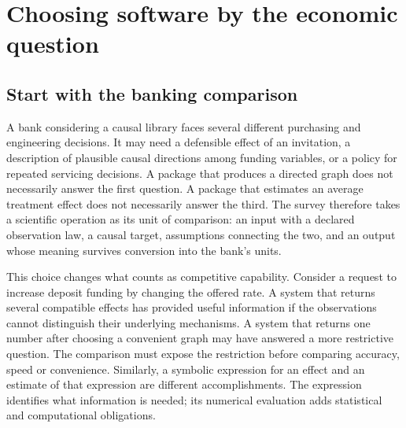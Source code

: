 \chapter{Choosing software by the economic question}
\label{exec13:survey}

\section{Start with the banking comparison}

A bank considering a causal library faces several different purchasing and
engineering decisions. It may need a defensible effect of an invitation, a
description of plausible causal directions among funding variables, or a
policy for repeated servicing decisions. A package that produces a directed
graph does not necessarily answer the first question. A package that estimates
an average treatment effect does not necessarily answer the third. The survey
therefore takes a scientific operation as its unit of comparison: an input
with a declared observation law, a causal target, assumptions connecting the
two, and an output whose meaning survives conversion into the bank's units.

This choice changes what counts as competitive capability. Consider a request
to increase deposit funding by changing the offered rate. A system that
returns several compatible effects has provided useful information if the
observations cannot distinguish their underlying mechanisms. A system that
returns one number after choosing a convenient graph may have answered a
more restrictive question. The comparison must expose the restriction before
comparing accuracy, speed or convenience. Similarly, a symbolic expression
for an effect and an estimate of that expression are different accomplishments.
The expression identifies what information is needed; its numerical evaluation
adds statistical and computational obligations.

